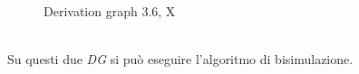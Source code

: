 \documentclass[a4paper]{article}
\begin{document}
\begin{figure}[!ht]
\centering
{}
\caption{Derivation graph 3.6, X} \label{FIG:3.6Eq}
\end{figure}\\
\newpage
Su questi due \textit{DG} si può eseguire l'algoritmo di bisimulazione.
\end{document}
